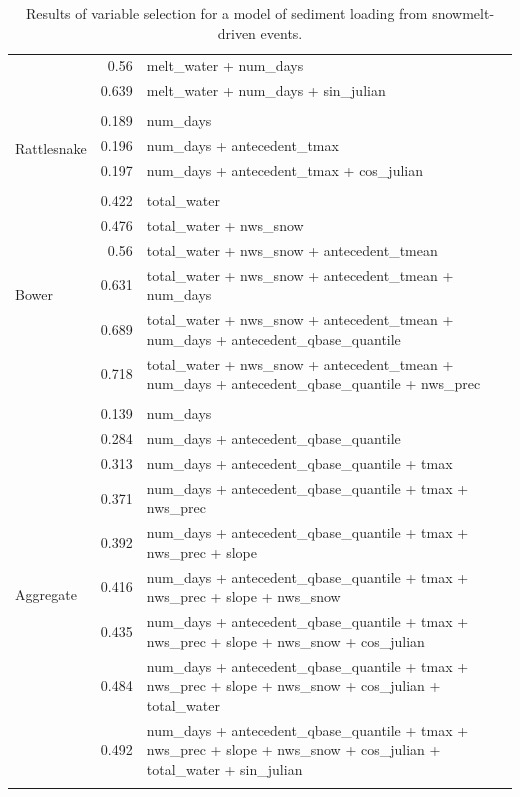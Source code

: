 \documentclass[10pt]{article}
\begin{document}
\begin{table}[h]
\begin{center}
\begin{tabular}{lrl}
 & 0.56 & melt\_water + num\_days\\ 
 & 0.639 & melt\_water + num\_days + sin\_julian\\ 
\vspace{2mm}\\ \multirow{4}{*}{Rattlesnake} & 0.189 & num\_days\\ 
 & 0.196 & num\_days + antecedent\_tmax\\ 
 & 0.197 & num\_days + antecedent\_tmax + cos\_julian\\ 
\vspace{2mm}\\ \multirow{7}{*}{Bower} & 0.422 & total\_water\\ 
 & 0.476 & total\_water + nws\_snow\\ 
 & 0.56 & total\_water + nws\_snow + antecedent\_tmean\\ 
 & 0.631 & total\_water + nws\_snow + antecedent\_tmean + num\_days\\ 
 & 0.689 & total\_water + nws\_snow + antecedent\_tmean + num\_days + antecedent\_qbase\_quantile\\ 
 & 0.718 & total\_water + nws\_snow + antecedent\_tmean + num\_days + antecedent\_qbase\_quantile + nws\_prec\\ 
\vspace{2mm}\\ \multirow{10}{*}{Aggregate} & 0.139 & num\_days\\ 
 & 0.284 & num\_days + antecedent\_qbase\_quantile\\ 
 & 0.313 & num\_days + antecedent\_qbase\_quantile + tmax\\ 
 & 0.371 & num\_days + antecedent\_qbase\_quantile + tmax + nws\_prec\\ 
 & 0.392 & num\_days + antecedent\_qbase\_quantile + tmax + nws\_prec + slope\\ 
 & 0.416 & num\_days + antecedent\_qbase\_quantile + tmax + nws\_prec + slope + nws\_snow\\ 
 & 0.435 & num\_days + antecedent\_qbase\_quantile + tmax + nws\_prec + slope + nws\_snow + cos\_julian\\ 
 & 0.484 & num\_days + antecedent\_qbase\_quantile + tmax + nws\_prec + slope + nws\_snow + cos\_julian + total\_water\\ 
 & 0.492 & num\_days + antecedent\_qbase\_quantile + tmax + nws\_prec + slope + nws\_snow + cos\_julian + total\_water + sin\_julian\\ 
\vspace{2mm}\\     \end{tabular}
    \caption{Results of variable selection for a model of sediment loading from snowmelt-driven events.\label{sed_r_square_snow}}
    \end{center}
\end{table}
\end{document}
